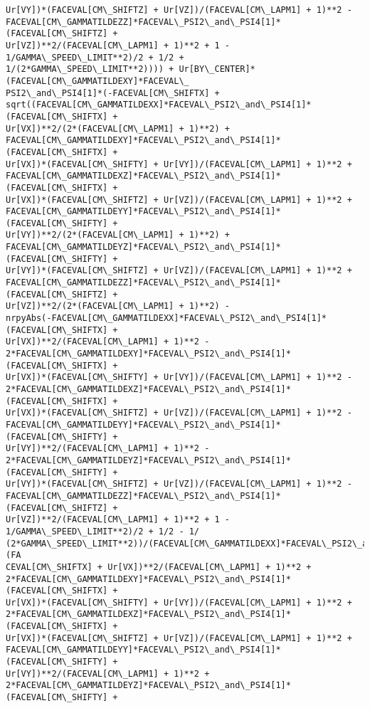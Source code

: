 \documentclass[landscape,letterpaper,10pt,english]{article}
\begin{document}
\begin{Verbatim}[commandchars=\\\{\}]
Ur[VY])*(FACEVAL[CM\_SHIFTZ] + Ur[VZ])/(FACEVAL[CM\_LAPM1] + 1)**2 -
FACEVAL[CM\_GAMMATILDEZZ]*FACEVAL\_PSI2\_and\_PSI4[1]*(FACEVAL[CM\_SHIFTZ] +
Ur[VZ])**2/(FACEVAL[CM\_LAPM1] + 1)**2 + 1 - 1/GAMMA\_SPEED\_LIMIT**2)/2 + 1/2 +
1/(2*GAMMA\_SPEED\_LIMIT**2)))) + Ur[BY\_CENTER]*(FACEVAL[CM\_GAMMATILDEXY]*FACEVAL\_
PSI2\_and\_PSI4[1]*(-FACEVAL[CM\_SHIFTX] +
sqrt((FACEVAL[CM\_GAMMATILDEXX]*FACEVAL\_PSI2\_and\_PSI4[1]*(FACEVAL[CM\_SHIFTX] +
Ur[VX])**2/(2*(FACEVAL[CM\_LAPM1] + 1)**2) +
FACEVAL[CM\_GAMMATILDEXY]*FACEVAL\_PSI2\_and\_PSI4[1]*(FACEVAL[CM\_SHIFTX] +
Ur[VX])*(FACEVAL[CM\_SHIFTY] + Ur[VY])/(FACEVAL[CM\_LAPM1] + 1)**2 +
FACEVAL[CM\_GAMMATILDEXZ]*FACEVAL\_PSI2\_and\_PSI4[1]*(FACEVAL[CM\_SHIFTX] +
Ur[VX])*(FACEVAL[CM\_SHIFTZ] + Ur[VZ])/(FACEVAL[CM\_LAPM1] + 1)**2 +
FACEVAL[CM\_GAMMATILDEYY]*FACEVAL\_PSI2\_and\_PSI4[1]*(FACEVAL[CM\_SHIFTY] +
Ur[VY])**2/(2*(FACEVAL[CM\_LAPM1] + 1)**2) +
FACEVAL[CM\_GAMMATILDEYZ]*FACEVAL\_PSI2\_and\_PSI4[1]*(FACEVAL[CM\_SHIFTY] +
Ur[VY])*(FACEVAL[CM\_SHIFTZ] + Ur[VZ])/(FACEVAL[CM\_LAPM1] + 1)**2 +
FACEVAL[CM\_GAMMATILDEZZ]*FACEVAL\_PSI2\_and\_PSI4[1]*(FACEVAL[CM\_SHIFTZ] +
Ur[VZ])**2/(2*(FACEVAL[CM\_LAPM1] + 1)**2) -
nrpyAbs(-FACEVAL[CM\_GAMMATILDEXX]*FACEVAL\_PSI2\_and\_PSI4[1]*(FACEVAL[CM\_SHIFTX] +
Ur[VX])**2/(FACEVAL[CM\_LAPM1] + 1)**2 -
2*FACEVAL[CM\_GAMMATILDEXY]*FACEVAL\_PSI2\_and\_PSI4[1]*(FACEVAL[CM\_SHIFTX] +
Ur[VX])*(FACEVAL[CM\_SHIFTY] + Ur[VY])/(FACEVAL[CM\_LAPM1] + 1)**2 -
2*FACEVAL[CM\_GAMMATILDEXZ]*FACEVAL\_PSI2\_and\_PSI4[1]*(FACEVAL[CM\_SHIFTX] +
Ur[VX])*(FACEVAL[CM\_SHIFTZ] + Ur[VZ])/(FACEVAL[CM\_LAPM1] + 1)**2 -
FACEVAL[CM\_GAMMATILDEYY]*FACEVAL\_PSI2\_and\_PSI4[1]*(FACEVAL[CM\_SHIFTY] +
Ur[VY])**2/(FACEVAL[CM\_LAPM1] + 1)**2 -
2*FACEVAL[CM\_GAMMATILDEYZ]*FACEVAL\_PSI2\_and\_PSI4[1]*(FACEVAL[CM\_SHIFTY] +
Ur[VY])*(FACEVAL[CM\_SHIFTZ] + Ur[VZ])/(FACEVAL[CM\_LAPM1] + 1)**2 -
FACEVAL[CM\_GAMMATILDEZZ]*FACEVAL\_PSI2\_and\_PSI4[1]*(FACEVAL[CM\_SHIFTZ] +
Ur[VZ])**2/(FACEVAL[CM\_LAPM1] + 1)**2 + 1 - 1/GAMMA\_SPEED\_LIMIT**2)/2 + 1/2 - 1/
(2*GAMMA\_SPEED\_LIMIT**2))/(FACEVAL[CM\_GAMMATILDEXX]*FACEVAL\_PSI2\_and\_PSI4[1]*(FA
CEVAL[CM\_SHIFTX] + Ur[VX])**2/(FACEVAL[CM\_LAPM1] + 1)**2 +
2*FACEVAL[CM\_GAMMATILDEXY]*FACEVAL\_PSI2\_and\_PSI4[1]*(FACEVAL[CM\_SHIFTX] +
Ur[VX])*(FACEVAL[CM\_SHIFTY] + Ur[VY])/(FACEVAL[CM\_LAPM1] + 1)**2 +
2*FACEVAL[CM\_GAMMATILDEXZ]*FACEVAL\_PSI2\_and\_PSI4[1]*(FACEVAL[CM\_SHIFTX] +
Ur[VX])*(FACEVAL[CM\_SHIFTZ] + Ur[VZ])/(FACEVAL[CM\_LAPM1] + 1)**2 +
FACEVAL[CM\_GAMMATILDEYY]*FACEVAL\_PSI2\_and\_PSI4[1]*(FACEVAL[CM\_SHIFTY] +
Ur[VY])**2/(FACEVAL[CM\_LAPM1] + 1)**2 +
2*FACEVAL[CM\_GAMMATILDEYZ]*FACEVAL\_PSI2\_and\_PSI4[1]*(FACEVAL[CM\_SHIFTY] +

\end{Verbatim}
\end{document}
